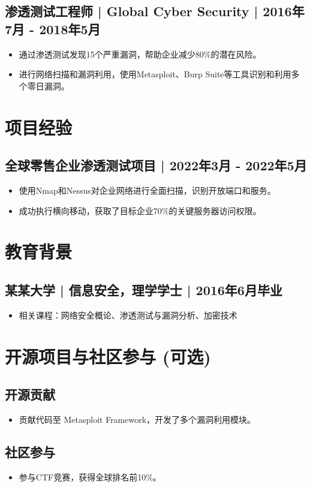 \documentclass[a4paper,10pt]{article}
\begin{document}
\subsection*{渗透测试工程师 | Global Cyber Security | 2016年7月 - 2018年5月}
\begin{itemize}[leftmargin=*]
    \item 通过渗透测试发现15个严重漏洞，帮助企业减少80\%的潜在风险。
    \item 进行网络扫描和漏洞利用，使用Metasploit、Burp Suite等工具识别和利用多个零日漏洞。
\end{itemize}

\section*{项目经验}

\subsection*{全球零售企业渗透测试项目 | 2022年3月 - 2022年5月}
\begin{itemize}[leftmargin=*]
    \item 使用Nmap和Nessus对企业网络进行全面扫描，识别开放端口和服务。
    \item 成功执行横向移动，获取了目标企业70\%的关键服务器访问权限。
\end{itemize}

\section*{教育背景}

\subsection*{某某大学 | 信息安全，理学学士 | 2016年6月毕业}
\begin{itemize}[leftmargin=*]
    \item 相关课程：网络安全概论、渗透测试与漏洞分析、加密技术
\end{itemize}

\section*{开源项目与社区参与 (可选)}

\subsection*{开源贡献}
\begin{itemize}[leftmargin=*]
    \item 贡献代码至 Metasploit Framework，开发了多个漏洞利用模块。
\end{itemize}

\subsection*{社区参与}
\begin{itemize}[leftmargin=*]
    \item 参与CTF竞赛，获得全球排名前10\%。
\end{itemize}
\end{document}
